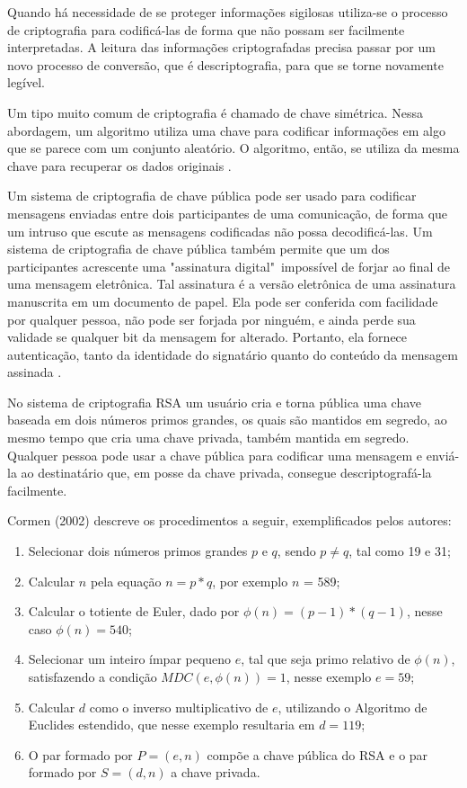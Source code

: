 Quando há necessidade de se proteger informações sigilosas utiliza-se o processo de criptografia para codificá-las de forma que não possam ser facilmente interpretadas. A leitura das informações criptografadas precisa passar por um novo processo de conversão, que é descriptografia, para que se torne novamente legível.

Um tipo muito comum de criptografia é chamado de chave simétrica. Nessa abordagem, um algoritmo utiliza uma chave para codificar informações em algo que se parece com um conjunto aleatório. O algoritmo, então, se utiliza da mesma chave para recuperar os dados originais \cite{burnett:02}.

Um sistema de criptografia de chave pública pode ser usado para codificar mensagens enviadas entre dois participantes de uma comunicação, de forma que um intruso que escute as mensagens codificadas não possa decodificá-las. Um sistema de criptografia de chave pública também permite que um dos participantes acrescente uma "assinatura digital"\ impossível de forjar ao final de uma mensagem eletrônica. Tal assinatura é a versão eletrônica de uma assinatura manuscrita em um documento de papel. Ela pode ser conferida com facilidade por qualquer pessoa, não pode ser forjada por ninguém, e ainda perde sua validade se qualquer bit da mensagem for alterado. Portanto, ela fornece autenticação, tanto da identidade do signatário quanto do conteúdo da mensagem assinada \cite{cormen:02}.

No sistema de criptografia RSA um usuário cria e torna pública uma chave baseada em dois números primos grandes, os quais são mantidos em segredo, ao mesmo tempo que cria uma chave privada, também mantida em segredo. Qualquer pessoa pode usar a chave pública para codificar uma mensagem e enviá-la ao destinatário que, em posse da chave privada, consegue descriptografá-la facilmente.

Cormen (2002) descreve os procedimentos a seguir, exemplificados pelos autores:
\begin{enumerate}
    \item Selecionar dois números primos grandes $p$ e $q$, sendo $p \neq q$, tal como 19 e 31;
    \item Calcular $n$ pela equação $n=p*q$, por exemplo $n$ = 589;
    \item Calcular o totiente de Euler, dado por $\phi(n) = (p-1)*(q-1)$, nesse caso $\phi(n) = 540$;
    \item Selecionar um inteiro ímpar pequeno $e$, tal que seja primo relativo de $\phi(n)$, satisfazendo a condição $MDC(e,\phi(n)) = 1$, nesse exemplo $e = 59$;
    \item Calcular $d$ como o inverso multiplicativo de $e$, utilizando o Algoritmo de Euclides estendido, que nesse exemplo resultaria em $d = 119$;
    \item O par formado por $P = (e,n)$ compõe a chave pública do RSA  e o par formado por $S = (d,n)$ a chave privada.
\end{enumerate}

